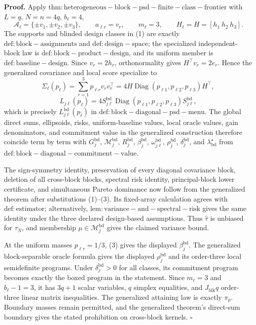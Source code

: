 \textbf{Proof.}
Apply \(\mathrm{thm:heterogeneous-block-psd-finite-class-frontier}\) with \(L=q\), \(N=n=4q\), \(b_\ell=4\),
\[
\mathcal A_\ell=\{\pm v_1,\pm v_2,\pm v_3\},
\qquad
a_{\ell r}=v_r,
\qquad
m_\ell=3,
\qquad
H_\ell=H=[h_1\ h_2\ h_3].
\tag{1}
\]
The supports and blinded design classes in (1) are exactly \(\mathrm{def:block-assignments}\) and \(\mathrm{def:design-space}\); the specialized independent-block law is \(\mathrm{def:block-product-design}\), and its uniform member is \(\mathrm{def:baseline-design}\).  Since \(v_r=2h_r\), orthonormality gives \(H^\top v_r=2e_r\).  Hence the generalized covariance and local score specialize to
\[
\Sigma_\ell(p_\ell)
=\sum_{r=1}^3p_{\ell r}v_rv_r^\top
=4H\operatorname{Diag}(p_{\ell1},p_{\ell2},p_{\ell3})H^\top,
\tag{2}
\]
\[
L_{j\ell}(p_\ell)
=4S^{\mathrm{bd}}_{j\ell}
\operatorname{Diag}(p_{\ell1},p_{\ell2},p_{\ell3})
S^{\mathrm{bd}}_{j\ell},
\tag{3}
\]
which is precisely \(L^{\mathrm{bd}}_{j\ell}(p_\ell)\) in \(\mathrm{def:block-diagonal-psd-menu}\).  The global direct sums, ellipsoids, risks, uniform-baseline values, local oracle values, gain denominators, and commitment value in the generalized construction therefore coincide term by term with \(G_j^{\mathrm{bd}}\), \(\mathcal M_j^{\mathrm{bd}}\), \(R_j^{\mathrm{bd}}\), \(\beta_j^{\mathrm{bd}}\), \(\omega_{j\ell}^{\mathrm{bd}}\), \(\rho_j^{\mathrm{bd}}\), \(\delta_j^{\mathrm{bd}}\), and \(\lambda_{\mathrm{bd}}^\star\) from \(\mathrm{def:block-diagonal-commitment-value}\).

The sign-symmetry identity, preservation of every diagonal covariance block, deletion of all cross-block blocks, spectral risk identity, principal-block lower certificate, and simultaneous Pareto dominance now follow from the generalized theorem after substitutions (1)--(3).  Its fixed-array calculation agrees with \(\mathrm{def:estimator}\); alternatively, \(\mathrm{lem:variance-and-spectral-risk}\) gives the same identity under the three declared design-based assumptions.  Thus \(\widehat\tau\) is unbiased for \(\tau_N\), and membership \(\mu\in\mathcal M_j^{\mathrm{bd}}\) gives the claimed variance bound.

At the uniform masses \(p_{\ell r}=1/3\), (3) gives the displayed \(\beta_j^{\mathrm{bd}}\).  The generalized block-separable oracle formula gives the displayed \(\rho_j^{\mathrm{bd}}\) and its order-three local semidefinite programs.  Under \(\delta_j^{\mathrm{bd}}>0\) for all classes, its commitment program becomes exactly the boxed program in the statement.  Since \(m_\ell=3\) and \(b_\ell-1=3\), it has \(3q+1\) scalar variables, \(q\) simplex equalities, and \(J_{\mathrm{blk}}q\) order-three linear matrix inequalities.  The generalized attaining law is exactly \(\pi_p\).  Boundary masses remain permitted, and the generalized theorem's direct-sum boundary gives the stated prohibition on cross-block kernels. \(\square\)